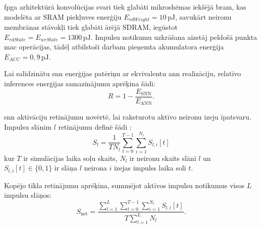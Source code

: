 \Gls{fpga} arhitektūrā konvolūcijas svari tiek glabāti mikroshēmas iekšējā \Gls{bram}, kas modelēta ar SRAM piekļuves
enerģiju \(E_{rdWeight}=10\,\mathrm{pJ}\), savukārt neironu membrānas stāvokļi tiek glabāti ārējā SDRAM, iegūstot
\(E_{rdState}=E_{wrState}=1300\,\mathrm{pJ}\). Impulsu notikumu uzkrāšana aizstāj peldošā punkta \Gls{mac} operācijas, tādēļ atbilstoši darbam \cite{horowitz2014} pieņemta akumulatora enerģija \(E_{ACC}=0{,}9\,\mathrm{pJ}\).

Lai salīdzinātu \Gls{snn} enerģijas patēriņu ar ekvivalentu \Gls{ann} realizāciju, relatīvo inferences enerģijas samazinājumu aprēķina šādi:
\begin{equation}
    R = 1-\frac{E_{\mathrm{SNN}}}{E_{\mathrm{ANN}}}.
    \label{eq:delta_e}
\end{equation}

\Gls{snn} aktivāciju retinājumu novērtē, lai raksturotu aktīvo neironu izeju īpatsvaru. Impulsu slānim \(l\) retinājumu definē šādi \cite{Zhou2020}:
\begin{equation}
  S_l = \frac{1}{T N_l}
    \sum_{t=0}^{T-1}
    \sum_{i=1}^{N_l}
    S_{l,i}[t]
    \label{eq:layer_sparsity}
\end{equation}
kur \(T\) ir simulācijas laika soļu skaits, \(N_l\) ir neironu skaits slānī \(l\) un \(S_{l,i}[t] \in \{0,1\}\) ir slāņa \(l\) neirona \(i\) izejas impulss laika solī \(t\).

Kopējo tīkla retinājumu aprēķina, summējot aktīvos impulsu notikumus visos \(L\) impulsu slāņos:
\begin{equation}
    S_{\mathrm{net}} =
    \frac{
    \displaystyle
    \sum_{l=1}^{L}
    \sum_{t=0}^{T-1}
    \sum_{i=1}^{N_l}
    S_{l,i}[t]
    }{
    \displaystyle T \sum_{l=1}^{L} N_l
    }.
    \label{eq:network_sparsity}
\end{equation}



